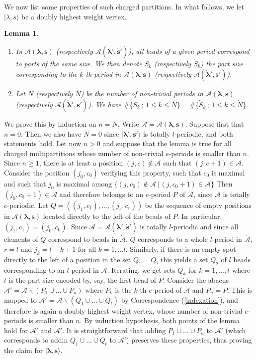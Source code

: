 \documentclass[twoside,12pt]{amsart}
\theoremstyle{plain}
\newcommand{\cA}{\mathcal{A}}
\newcommand{\bs}{\mathbf{s}}
\newcommand{\la}{\lambda}
\newcommand{\bla}{\boldsymbol{\la}}
\newcommand{\dS}{\dot{S}}
\newcommand{\dN}{\dot{N}}
\newcommand{\dbs}{\dot{\bs}}
\newcommand{\dbla}{\dot{\bla}}
\newtheorem{lem}[num]{Lemma}
\theoremstyle{remark}
\begin{document}
We now list some properties of such charged partitions.
In what follows, we let $|\la,s\rangle$ be a doubly highest weight vertex.

\begin{lem}\label{lem_double_2}\
\begin{enumerate}
 \item In $\cA(\bla,\bs)$ (respectively $\cA(\dbla',\dbs')$),
 all beads of a given period correspond to parts of the same size.
 We then denote $S_k$ (respectively $\dS_k$) the part size corresponding to the $k$-th period
 in $\cA(\bla,\bs)$ (respectively $\cA(\dbla',\dbs')$).
 \item Let $N$ (respectively $\dN$) be the number
 of non-trivial periods in $\cA(\bla,\bs)$ (respectively $\cA(\dbla',\dbs')$).
 We have $\#\{ S_k \, ; \, 1\leq k \leq N \} = \#\{ \dS_k \, ; \, 1\leq k \leq \dN \}$.
\end{enumerate}
\end{lem}


\proof
We prove this by induction on $n=N$. Write $\cA=\cA(\bla,\bs)$.
Suppose first that $n=0$.
Then we also have $\dN=0$ since 
$|\dbla',\dbs'\rangle$ is totally $l$-periodic, and both statements hold.
Let now $n>0$ and suppose that the lemma is true for all charged multipartitions
whose number of non-trivial $e$-periods is smaller than $n$.
Since $n\geq 1$, there is at least a position $(j,c)\notin\cA$
such that $(j,c+1)\in\cA$. 
Consider the position $(j_0,c_0)$ verifying this property, such that $c_0$ is maximal and such that
$j_0$ is maximal among $\{ (j,c_0)\notin\cA \, | \, (j,c_0+1)\in\cA \}$
Then $(j_0,c_0+1)\in\cA$ and therefore belongs to an $e$-period $P$ of $\cA$, since
$\cA$ is totally $e$-periodic.
Let $Q=((j_1,c_1),\dots, (j_r,c_r))$ be the sequence of empty positions in $\cA(\bla,\bs)$
located directly to the left of the beads of $P$.
In particular, $(j_1,c_1)=(j_0,c_0)$.
Since $\dot{\cA}=\cA(\dbla',\dbs')$ is totally $l$-periodic
and since all elements of $Q$ correspond to beads in $\dot{\cA}$, 
$Q$ corresponds to a whole $l$-period in $\dot{\cA}$,
$r=l$ and $j_k=l-k+1$ for all $k=1,\dots l$.
Similarly, if there is an empty spot directly to the left of a position in the set $Q_1=Q$,
this yields a set $Q_2$ of $l$ beads corresponding to an $l$-period in $\dot{\cA}$.
Iterating, we get sets $Q_k$ for $k=1,\dots,t$ where $t$ is the part size encoded by, say, 
the first bead of $P$.
Consider the abacus $\cA'=\cA\backslash (P_1\cup\dots\cup P_u)$ where
$P_k$ is the $k$-th $e$-period of $\cA$ and $P_u=P$.
This is mapped to $\dot{\cA}'=\dot{\cA}\backslash(Q_1\cup\dots\cup Q_t)$ by Correspondence (\ref{indexation}),
and therefore is again a doubly highest weight vertex, whose
number of non-trivial $e$-periods is smaller than $n$.
By induction hypothesis, both points of the lemma hold for $\cA'$ and $\dot{\cA}'$.
It is straightforward that adding $P_1\cup\dots\cup P_u$ to $\cA'$ 
(which corresponds to addin $Q_1\cup\dots\cup Q_t$ to $\dot{\cA}'$)
preserves these properties, thus proving the claim for $|\bla,\bs\rangle$.
\endproof
\end{document}

